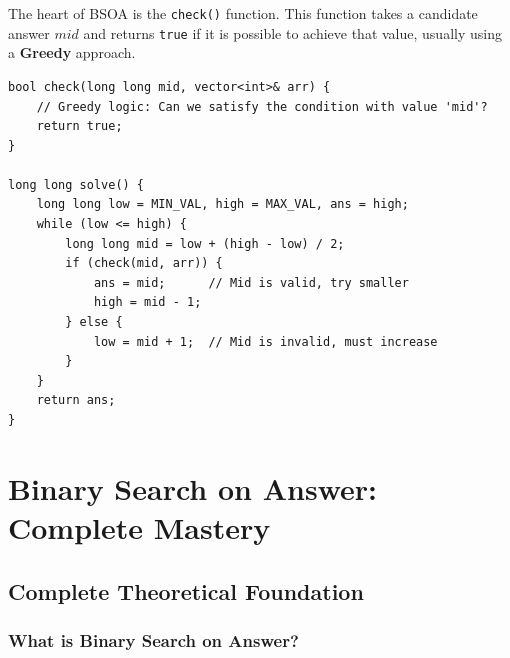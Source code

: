 \documentclass[11pt,a4paper,oneside]{book}
\begin{document}
The heart of BSOA is the \texttt{check()} function. This function takes a candidate answer $mid$ and returns \texttt{true} if it is possible to achieve that value, usually using a \textbf{Greedy} approach.

\begin{tcolorbox}[enhanced, colback=darkgray!5!white, colframe=darkgray, title=BSOA Template (Minimization)]
\begin{verbatim}
bool check(long long mid, vector<int>& arr) {
    // Greedy logic: Can we satisfy the condition with value 'mid'?
    return true; 
}

long long solve() {
    long long low = MIN_VAL, high = MAX_VAL, ans = high;
    while (low <= high) {
        long long mid = low + (high - low) / 2;
        if (check(mid, arr)) {
            ans = mid;      // Mid is valid, try smaller
            high = mid - 1;
        } else {
            low = mid + 1;  // Mid is invalid, must increase
        }
    }
    return ans;
}
\end{verbatim}
\end{tcolorbox}

\section{Binary Search on Answer: Complete Mastery}

\subsection{Complete Theoretical Foundation}

\subsubsection{What is Binary Search on Answer?}
\end{document}
